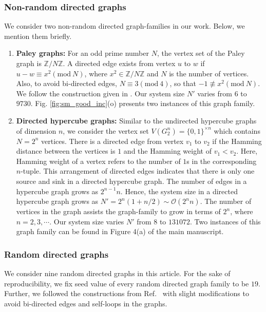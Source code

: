 \documentclass[%
 reprint,
 superscriptaddress,
 amsmath,amssymb,
 aps,
 pra,
floatfix,
nofootinbib,
]{revtex4-2}
\theoremstyle{definition}
\theoremstyle{remark}
\begin{document}
\begin{appendix}
\subsubsection{Non-random directed graphs}
We consider two non-random directed graph-families in our work. Below, we mention them briefly.
\begin{enumerate} 
    \item 
    \textbf{Paley graphs:} 
    For an odd prime number $N$, the vertex set of the Paley graph is $\mathbb{Z}/N\mathbb{Z}$. A directed edge exists from vertex $u$ to $w$ if $u - w \equiv{x^2 (\text{mod}\ N)}$, where $x^2 \in \mathbb{Z}/N\mathbb{Z}$ and $N$ is the number of vertices. Also, to avoid bi-directed edges, $N \equiv 3  (\text{mod}\ 4)$, so that $-1 \not \equiv x^2(\text{mod}\ N)$. We follow the construction given in \cite{networkx}. Our system size $N'$ varies from $6$ to $9730$. Fig. \ref{fig:sm_good_inc}(o) presents two instances of this graph family.
     
    \item 
    \textbf{Directed hypercube graphs:}
    Similar to the undirected hypercube graphs of dimension $n$, we consider the vertex set $V(G_2^n) = \{0, 1\}^{\times n}$ which contains $N=2^n$ vertices. There is a directed edge from vertex $v_1$ to $v_2$ if the Hamming distance between the vertices is $1$ and the Hamming weight of $v_1 < v_2$. Here, Hamming weight of a vertex refers to the number of $1$s in the corresponding $n$-tuple. This arrangement of directed edges indicates that there is only one source and sink in a directed hypercube graph. The number of edges in a hypercube graph grows as $2^{n-1}n$. Hence, the system size in a directed hypercube graph grows as $N' = 2^n(1+n/2) \sim \mathcal{O}(2^nn)$. The number of vertices in the graph assists the graph-family to grow in terms of $2^n$, where $n=2, 3, \cdots$. Our system size varies $N'$ from $8$ to $131072$. Two instances of this graph family can be found in  Figure 4(a) of the main manuscript. 

\end{enumerate}

\subsubsection{Random directed graphs}
We consider nine random directed graphs in this article. For the sake of reproducibility, we fix seed value of every random directed graph family to be $19$. Further, we followed the constructions from Ref.~\cite{networkx} with slight modifications to avoid bi-directed edges and self-loops in the graphs. 


\end{appendix}
\end{document}
